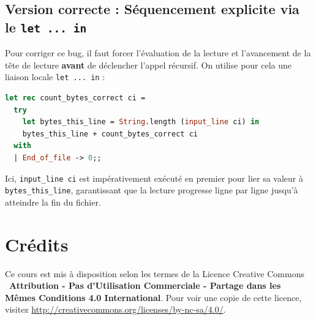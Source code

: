 \documentclass{article}
\begin{document}
\subsection{Version correcte : Séquencement explicite via le \texttt{let ... in}}

Pour corriger ce bug, il faut forcer l'évaluation de la lecture et l'avancement de la tête de lecture \textbf{avant} de déclencher l'appel récursif. On utilise pour cela une liaison locale \texttt{let ... in} :

\begin{lstlisting}[language=Caml]
let rec count_bytes_correct ci =
  try
    let bytes_this_line = String.length (input_line ci) in
    bytes_this_line + count_bytes_correct ci
  with
  | End_of_file -> 0;;
\end{lstlisting}

\noindent Ici, \texttt{input\_line ci} est impérativement exécuté en premier pour lier sa valeur à \texttt{bytes\_this\_line}, garantissant que la lecture progresse ligne par ligne jusqu'à atteindre la fin du fichier.


\noindent{}

\newpage
\tableofcontents

\section*{Crédits}
Ce cours est mis à disposition selon les termes de la Licence Creative Commons \ccbyncsa\ \textbf{Attribution - Pas d'Utilisation Commerciale - Partage dans les Mêmes Conditions 4.0 International}. 
Pour voir une copie de cette licence, visitez \url{http://creativecommons.org/licenses/by-nc-sa/4.0/}.
\end{document}
